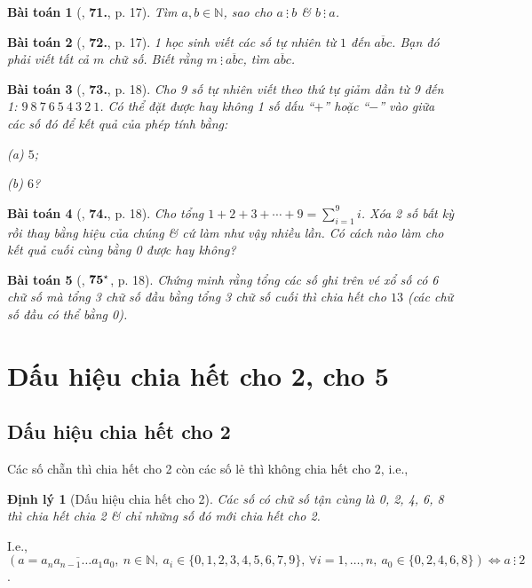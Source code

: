 \documentclass[oneside]{book}
\numberwithin{equation}{section}
\newtheorem{baitoan}{Bài toán}[section]
\newtheorem{dinhly}{Định lý}[section]
\begin{document}
\begin{baitoan}[\cite{Binh_Toan_6_tap_1}, \textbf{71.}, p. 17]
	Tìm $a,b\in\mathbb{N}$, sao cho $a\ \vdots\ b$ \& $b\ \vdots\ a$.
\end{baitoan}

\begin{baitoan}[\cite{Binh_Toan_6_tap_1}, \textbf{72.}, p. 17]
	1 học sinh viết các số tự nhiên từ $1$ đến $\overline{abc}$. Bạn đó phải viết tất cả $m$ chữ số. Biết rằng $m\ \vdots\ \overline{abc}$, tìm $\overline{abc}$.
\end{baitoan}

\begin{baitoan}[\cite{Binh_Toan_6_tap_1}, \textbf{73.}, p. 18]
	Cho 9 số tự nhiên viết theo thứ tự giảm dần từ 9 đến 1: $9\ 8\ 7\ 6\ 5\ 4\ 3\ 2\ 1$. Có thể đặt được hay không 1 số dấu ``$+$'' hoặc ``$-$'' vào giữa các số đó để kết quả của phép tính bằng:
	\begin{enumerate*}
		\item[(a)] $5$;
		\item[(b)] $6$?
	\end{enumerate*}
\end{baitoan}

\begin{baitoan}[\cite{Binh_Toan_6_tap_1}, \textbf{74.}, p. 18]
	Cho tổng $1 + 2 + 3 + \cdots + 9 = \sum_{i=1}^9 i$. Xóa 2 số bất kỳ rồi thay bằng hiệu của chúng \& cứ làm như vậy nhiều lần. Có cách nào làm cho kết quả cuối cùng bằng 0 được hay không?
\end{baitoan}

\begin{baitoan}[\cite{Binh_Toan_6_tap_1}, $\bf 75^\star$, p. 18]
	Chứng minh rằng tổng các số ghi trên vé xổ số có 6 chữ số mà tổng 3 chữ số đầu bằng tổng 3 chữ số cuối thì chia hết cho $13$ (các chữ số đầu có thể bằng 0).
\end{baitoan}

\section{Dấu hiệu chia hết cho 2, cho 5}

\subsection{Dấu hiệu chia hết cho 2}
Các số chẵn thì chia hết cho 2 còn các số lẻ thì không chia hết cho 2, i.e.,

\begin{dinhly}[Dấu hiệu chia hết cho 2]
	Các số có chữ số tận cùng là 0, 2, 4, 6, 8 thì chia hết chia 2 \textit{\&} chỉ những số đó mới chia hết cho 2.
\end{dinhly}
I.e., $(a = \overline{a_na_{n-1}\ldots a_1a_0},\ n\in\mathbb{N},\ a_i\in\{0,1,2,3,4,5,6,7,9\},\,\forall i = 1,\ldots,n,\ a_0\in\{0,2,4,6,8\})\Leftrightarrow a\ \vdots\ 2$.
\end{document}
